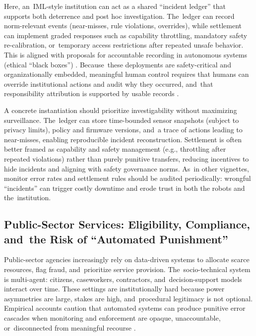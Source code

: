 \documentclass[mca,article,accept,pdftex,oneauthor]{Definitions/mdpi}
\begin{document}
Here, an~IML-style institution can act as a shared ``incident ledger'' that supports both deterrence and post hoc investigation. The~ledger can record norm-relevant events (near-misses, rule violations, overrides), while settlement can implement graded responses such as capability throttling, mandatory safety re-calibration, or~temporary access restrictions after repeated unsafe behavior. This is aligned with proposals for accountable recording in autonomous systems (ethical ``black boxes'') \citep{WinfieldJirotka2017}. Because~these deployments are safety-critical and organizationally embedded, meaningful human control requires that humans can override institutional actions and audit why they occurred, and~that responsibility attribution is supported by usable records \citep{Santoni2018MHC,Shneiderman2020HCAI}.

A concrete instantiation should prioritize investigability without maximizing surveillance. The~ledger can store time-bounded sensor snapshots (subject to privacy limits), policy and firmware versions, and~a trace of actions leading to near-misses, enabling reproducible incident reconstruction. Settlement is often better framed as capability and safety management (e.g., throttling after repeated violations) rather than purely punitive transfers, reducing incentives to hide incidents and aligning with safety governance norms. As~in other vignettes, monitor error rates and settlement rules should be audited periodically: wrongful ``incidents'' can trigger costly downtime and erode trust in both the robots and the~institution.

\subsection{Public-Sector Services: Eligibility, Compliance, and~the Risk of ``Automated Punishment''}

Public-sector agencies increasingly rely on data-driven systems to allocate scarce resources, flag fraud, and~prioritize service provision. The~socio-technical system is multi-agent: citizens, caseworkers, contractors, and~decision-support models interact over time. These settings are institutionally hard because power asymmetries are large, stakes are high, and~procedural legitimacy is not optional. Empirical accounts caution that automated systems can produce punitive error cascades when monitoring and enforcement are opaque, unaccountable, or~disconnected from meaningful recourse \citep{Eubanks2018AutomatingInequality,ONeil2016WMD}.
\end{document}
